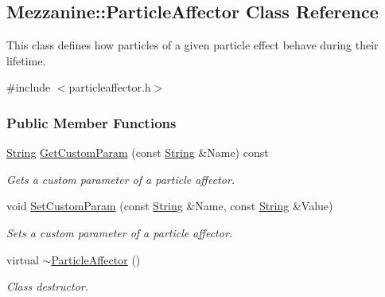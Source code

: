 \hypertarget{classMezzanine_1_1ParticleAffector}{
\subsection{Mezzanine::ParticleAffector Class Reference}
\label{classMezzanine_1_1ParticleAffector}
}


This class defines how particles of a given particle effect behave during their lifetime.  




{\ttfamily \#include $<$particleaffector.h$>$}

\subsubsection*{Public Member Functions}
\begin{DoxyCompactItemize}
\item 
\hyperlink{namespaceMezzanine_acf9fcc130e6ebf08e3d8491aebcf1c86}{String} \hyperlink{classMezzanine_1_1ParticleAffector_a2240b3dd59a656c63407cd8a719824b8}{GetCustomParam} (const \hyperlink{namespaceMezzanine_acf9fcc130e6ebf08e3d8491aebcf1c86}{String} \&Name) const 
\begin{DoxyCompactList}\small\item\em Gets a custom parameter of a particle affector. \item\end{DoxyCompactList}\item 
void \hyperlink{classMezzanine_1_1ParticleAffector_a0467b8c51e34cf7f2e71189fa60a3716}{SetCustomParam} (const \hyperlink{namespaceMezzanine_acf9fcc130e6ebf08e3d8491aebcf1c86}{String} \&Name, const \hyperlink{namespaceMezzanine_acf9fcc130e6ebf08e3d8491aebcf1c86}{String} \&Value)
\begin{DoxyCompactList}\small\item\em Sets a custom parameter of a particle affector. \item\end{DoxyCompactList}\item 
\hypertarget{classMezzanine_1_1ParticleAffector_a86c8ed14bb0b264f729988feeef3fb77}{
virtual \hyperlink{classMezzanine_1_1ParticleAffector_a86c8ed14bb0b264f729988feeef3fb77}{$\sim$ParticleAffector} ()}
\label{classMezzanine_1_1ParticleAffector_a86c8ed14bb0b264f729988feeef3fb77}

\begin{DoxyCompactList}\small\item\em Class destructor. \item\end{DoxyCompactList}\end{DoxyCompactItemize}
